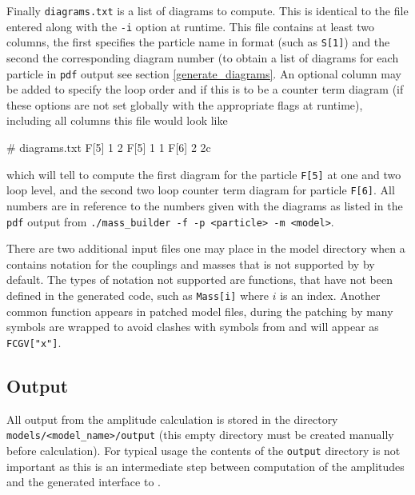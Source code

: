 Finally \lstinline{diagrams.txt} is a list of diagrams to compute.  This is identical to the file entered along with the \lstinline{-i} option at runtime.  This file contains at least two columns, the first specifies the particle name in \feynarts format (such as \lstinline{S[1]}) and the second the corresponding diagram number (to obtain a list of diagrams for each particle in \lstinline{pdf} output see section \ref{generate_diagrams}.  An optional column may be added to specify the loop order and if this is to be a counter term diagram (if these options are not set globally with the appropriate flags at runtime), including all columns this file would look like
\begin{lstterm}
# diagrams.txt
F[5]   1   2
F[5]   1   1
F[6]   2   2c
\end{lstterm}
which will tell \mb to compute the first diagram for the particle \lstinline{F[5]} at one and two loop level, and the second two loop counter term diagram for particle \lstinline{F[6]}.  All numbers are in reference to the numbers given with the diagrams as listed in the \lstinline{pdf} output from \lstinline{./mass_builder -f -p <particle> -m <model>}.

There are two additional input files one may place in the model directory when a \feynarts contains notation for the couplings and masses that is not supported by \mb by default.  The types of notation not supported are functions, that have not been defined in the generated code, such as \lstinline{Mass[i]} where $i$ is an index.  Another common function appears in patched \feynarts model files, during the patching by \feyncalc many symbols are wrapped to avoid clashes with symbols from \feyncalc and will appear as \lstinline{FCGV["x"]}.  


\subsection{Output}

All output from the amplitude calculation is stored in the directory \lstinline{models/<model_name>/output} (this empty directory must be created manually before calculation).  For typical usage the contents of the \lstinline{output} directory is not important as this is an intermediate step between computation of the amplitudes and the generated \CC interface to \tsils.

